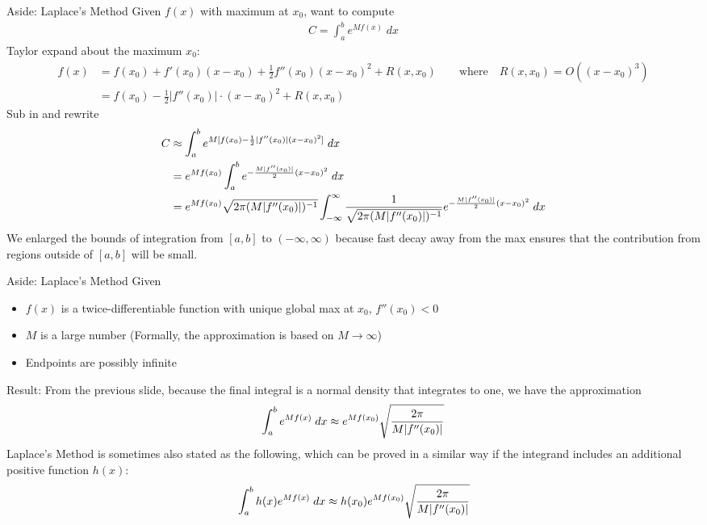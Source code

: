 \documentclass[aspectratio=169, handout]{beamer}
\newcommand{\ra}{\rightarrow}
\begin{document}
{\scriptsize
\begin{frame}{Aside: Laplace's Method}
Given $f(x)$ with maximum at $x_0$, want to compute
\begin{align*}
  C = \int_a^b e^{M f(x)}\;dx
\end{align*}
Taylor expand about the maximum $x_0$:
\begin{align*}
  f(x)
  &=
  f(x_0)
  +
  f'(x_0)
  (x-x_0)
  +
  \frac{1}{2}
  f''(x_0)
  (x-x_0)^2
  +
  R(x,x_0)
  \qquad \text{where}\quad
  R(x,x_0)
  =O((x-x_0)^3)
  \\
  &=
  f(x_0)
  -
  \frac{1}{2}
  \big|f''(x_0)\big|
  \cdot
  (x-x_0)^2
  +
  R(x,x_0)
\end{align*}
Sub in and rewrite
\begin{align*}
  C
  &\approx
  \int_a^b
  e^{%
    M
    [
    f(x_0)
    -
    \frac{1}{2}
    |f''(x_0)|
    (x-x_0)^2
    ]
  }
  \;dx
  \\
  &=
  e^{%
    M
    f(x_0)
  }
  \int_a^b
  e^{%
    -
    \frac{M|f''(x_0)|}{2}
    (x-x_0)^2
  }
  \;dx
  \\
  &=
  e^{%
    M
    f(x_0)
  }
  \sqrt{2\pi(M|f''(x_0)|)^{-1}}
  \int_{-\infty}^\infty
  \frac{1}{\sqrt{2\pi(M|f''(x_0)|)^{-1}}}
  e^{%
    -
    \frac{M|f''(x_0)|}{2}
    (x-x_0)^2
  }
  \;dx
\end{align*}
We enlarged the bounds of integration  from $[a,b]$ to
$(-\infty,\infty)$ because fast decay away from the max ensures that the
contribution from regions outside of $[a,b]$ will be small.
\end{frame}
}





{\footnotesize
\begin{frame}{Aside: Laplace's Method}
Given
\begin{itemize}
  \item $f(x)$ is a twice-differentiable function
    with unique global max at $x_0$,
    $f''(x_0)<0$
  \item $M$ is a large number
    (Formally, the approximation is based on $M\ra\infty$)
  \item Endpoints are possibly infinite
\end{itemize}
\alert{Result}:
From the previous slide, because the final integral is a normal density
that integrates to one, we have the approximation
\begin{align*}
  \int_a^b e^{Mf(x)}\;dx
  \approx
  e^{%
    M
    f(x_0)
  }
  \sqrt{%
  \frac{%
    2\pi
  }{%
    M|f''(x_0)|
  }
  }
\end{align*}
Laplace's Method is sometimes also stated as the following, which can
be proved in a similar way if the integrand includes an additional
positive function $h(x)$:
\begin{align*}
  \int_a^b h(x)e^{Mf(x)}\;dx
  \approx
  h(x_0)
  e^{%
    M
    f(x_0)
  }
  \sqrt{%
  \frac{%
    2\pi
  }{%
    M|f''(x_0)|
  }
  }
\end{align*}
\end{frame}
}
\end{document}
